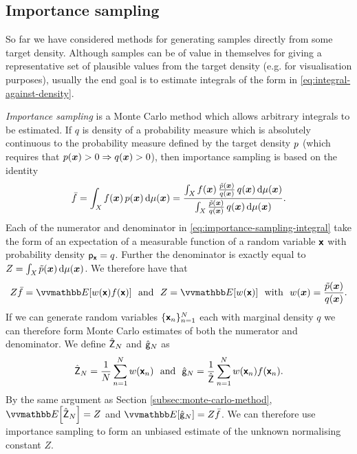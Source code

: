 \subsection{Importance sampling}

So far we have considered methods for generating samples directly from some target density. Although samples can be of value in themselves for giving a representative set of plausible values from the target density (e.g. for visualisation purposes), usually the end goal is to estimate integrals of the form in \eqref{eq:integral-against-density}. 

\emph{Importance sampling} \citep{kahn1951estimation} is a Monte Carlo method which allows arbitrary integrals to be estimated. If $q$ is density of a probability measure which is absolutely continuous to the probability measure defined by the target density $p$ (which requires that $p(\boldsymbol{x}) > 0 \Rightarrow q(\boldsymbol{x}) > 0$), then importance sampling is based on the identity
\begin{equation}\label{eq:importance-sampling-integral}
  \bar{f} = \int_{\mathit{X}} f(\boldsymbol{x}) \,p(\boldsymbol{x}) \,\mathrm{d}\mu(\boldsymbol{x}) =
  \frac
  {\int_{\mathit{X}} f(\boldsymbol{x}) \,\frac{\tilde{p}(\boldsymbol{x})}{q(\boldsymbol{x})} \, q(\boldsymbol{x}) \,\mathrm{d}\mu(\boldsymbol{x})}
  {\int_{\mathit{X}} \frac{\tilde{p}(\boldsymbol{x})}{q(\boldsymbol{x})} \, q(\boldsymbol{x}) \,\mathrm{d}\mu(\boldsymbol{x})}.
\end{equation}
Each of the numerator and denominator in \eqref{eq:importance-sampling-integral} take the form of an expectation of a measurable function of a random variable $\boldsymbol{\mathsf{x}}$ with probability density $\mathsf{p}_{\boldsymbol{\mathsf{x}}} = q$. Further the denominator is exactly equal to $Z = \int_{\mathit{X}}\tilde{p}(\boldsymbol{x})\,\mathrm{d}\mu(\boldsymbol{x})$. We therefore have that
\begin{equation}\label{eq:importance-sampling-expectations}
  Z \bar{f} = \expc{w(\rvct{x}) f(\rvct{x})}
  ~~\textrm{and}~~
  Z = \expc{w(\rvct{x})}
  ~~\textrm{with}~~
  w(\vct{x}) = \frac{\utgtdens(\vct{x})}{q(\vct{x})}.
\end{equation}
If we can generate random variables $\lbrace \boldsymbol{\mathsf{x}}_n \rbrace_{n=1}^N$ each with marginal density $q$ we can therefore form Monte Carlo estimates of both the numerator and denominator. We define $\hat{\mathsf{Z}}_N$ and $\hat{\mathsf{g}}_N$ as
\begin{equation}\label{eq:importance-sampling-mc-estimates}
  \hat{\rvar{Z}}_N = \frac{1}{N} \sum_{n=1}^N w\lpa\rvct{x}_n\rpa
  ~~\textrm{and}~~
  \hat{\rvar{g}}_N = \frac{1}{\hat{\rvar{Z}}} \sum_{n=1}^N w\lpa\rvct{x}_n\rpa f\lpa\rvct{x}_n\rpa.
\end{equation}
By the same argument as Section \ref{subsec:monte-carlo-method}, $\expc{\hat{\rvar{Z}}_N} = Z$ and $\expc{\hat{\rvar{g}}_N} = Z\bar{f}$. We can therefore use importance sampling to form an unbiased estimate of the unknown normalising constant $Z$. 


